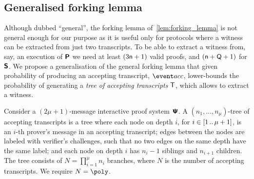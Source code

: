 \subsection{Generalised forking lemma}
Although dubbed ``general'', the forking lemma of~\cref{lem:forking_lemma} is not
general enough for our purpose as it is useful only for protocols where a witness
can be extracted from just two transcripts. To be able to extract a witness
from, say, an execution of $\bm{\mathsf{P}}$ we need at least
$(3 \mathsf{n} + 1)$ valid proofs, and $(\mathsf{n} + \mathsf{Q} + 1)$ for $\bm{\mathsf{S}}$. We
propose a generalisation of the general forking lemma that given probability of
producing an accepting transcript, $\accProb$, lower-bounds the probability of
generating a \emph{tree of accepting transcripts} $\mathsf{T}$, which allows to
extract a witness.

\begin{definition}
	\label{def:tree_of_accepting_transcripts}
	Consider a $(2\mu + 1)$-message interactive proof system $\bm{\mathsf{\Psi}}$. A $(n_1,
  \ldots, n_\mu)$-tree of accepting transcripts is a tree where each node on
  depth $i$, for $i \in [1 \, .. \, \mu + 1]$, is an $i$-th prover's message in an
  accepting transcript; edges between the nodes are labeled with verifier's
  challenges, such that no two edges on the same depth have the same
  label; and each node on depth $i$ has $n_{i} - 1$ siblings and $n_{i +
    1}$ children. The tree consists of $N = \prod_{i = 1}^\mu n_i$
  branches, where $N$ is the number of accepting transcripts. We require $N = \poly$.
\end{definition}


